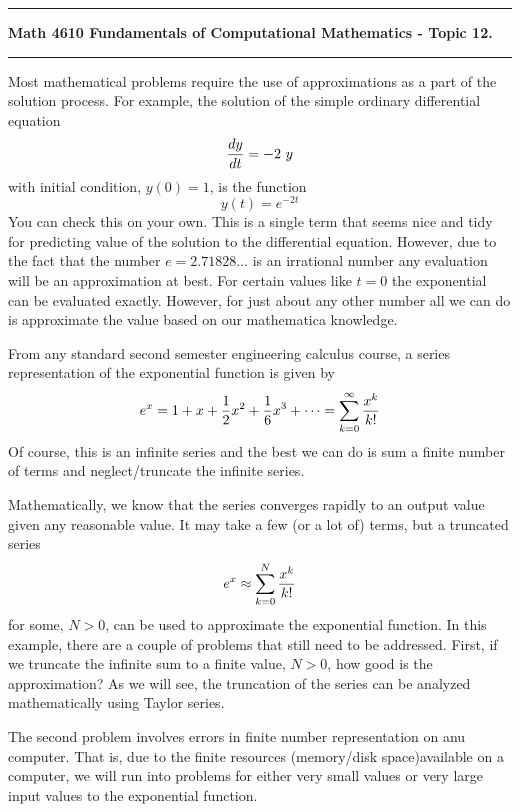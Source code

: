 \documentclass[10pt,fleqn]{article}
\begin{document}
\vskip0.1in\hrule\vskip0.1in \noindent
{\bf Math 4610 Fundamentals of Computational Mathematics  - Topic 12.}
\vskip0.1in\hrule\vskip0.1in \noindent
Most mathematical problems require the use of approximations as a part of the
solution process. For example, the solution of the simple ordinary differential
equation
\[
  {{dy}\over{dt}} = -2\ y
\]
with initial condition, \(y(0)=1\), is the function
\[
  y(t) = e^{-2t}
\]
You can check this on your own. This is a single term that seems nice and tidy
for predicting value of the solution to the differential equation. However, due
to the fact that the number \(e=2.71828...\) is an irrational number any
evaluation will be an approximation at best. For certain values like \(t=0\) the
exponential can be evaluated exactly. However, for just about any other number
all we can do is approximate the value based on our mathematica knowledge.

From any standard second semester engineering calculus course, a series 
representation of the exponential function is given by
\[
  e^x = 1 + x + {1\over 2} x^2 + {1\over 6} x^3 + \cdots
      = \sum_{k=0}^\infty {{x^k}\over{k!}}
\]
Of course, this is an infinite series and the best we can do is sum a finite
number of terms and neglect/truncate the infinite series.

Mathematically, we know that the series converges rapidly to an output value
given any reasonable value. It may take a few (or a lot of) terms, but a
truncated series
\[
  e^x \approx \sum_{k=0}^N {{x^k}\over{k!}}
\]
for some, \(N>0\), can be used to approximate the exponential function. In this
example, there are a couple of problems that still need to be addressed. First,
if we truncate the infinite sum to a finite value, \(N>0\), how good is the
approximation? As we will see, the truncation of the series can be analyzed
mathematically using Taylor series.

The second problem involves errors in finite number representation on anu
computer. That is, due to the finite resources (memory/disk space)available on
a computer, we will run into problems for either very small values or very large
input values to the exponential function.
\end{document}
